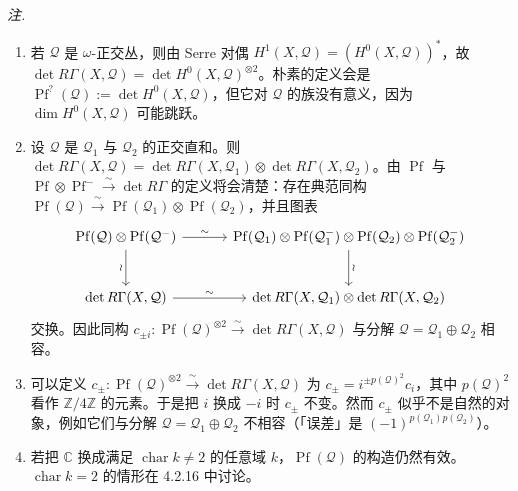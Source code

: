 \emph{注.}
\begin{enumerate}[label=(\roman*),leftmargin=2.2em]
\item 若 $\mathcal{Q}$ 是 $\omega$-正交丛，则由 Serre 对偶 $H^{1}(X,\mathcal{Q})=(H^{0}(X,\mathcal{Q}))^{*}$，故 $\det R\Gamma(X,\mathcal{Q})=\det H^{0}(X,\mathcal{Q})^{\otimes 2}$。朴素的定义会是 $\operatorname{Pf}^{?}(\mathcal{Q}):=\det H^{0}(X,\mathcal{Q})$，但它对 $\mathcal{Q}$ 的族没有意义，因为 $\dim H^{0}(X,\mathcal{Q})$ 可能跳跃。
\item 设 $\mathcal{Q}$ 是 $\mathcal{Q}_{1}$ 与 $\mathcal{Q}_{2}$ 的正交直和。则 $\det R\Gamma(X,\mathcal{Q})=\det R\Gamma(X,\mathcal{Q}_{1})\otimes\det R\Gamma(X,\mathcal{Q}_{2})$。由 $\operatorname{Pf}$ 与 $\operatorname{Pf}\otimes\operatorname{Pf}^{-}\xrightarrow{\sim}\det R\Gamma$ 的定义将会清楚：存在典范同构 $\operatorname{Pf}(\mathcal{Q})\xrightarrow{\ \sim\ }\operatorname{Pf}(\mathcal{Q}_{1})\otimes\operatorname{Pf}(\mathcal{Q}_{2})$，并且图表
\[
\begin{tikzcd}[column sep=3.2em, row sep=2.6em]
  \operatorname{Pf}(\mathcal{Q})\otimes\operatorname{Pf}(\mathcal{Q}^{-})
    \arrow[r, "\sim"]
    \arrow[d, "\wr"']
  & \operatorname{Pf}(\mathcal{Q}_{1})\otimes\operatorname{Pf}(\mathcal{Q}_{1}^{-})\otimes\operatorname{Pf}(\mathcal{Q}_{2})\otimes\operatorname{Pf}(\mathcal{Q}_{2}^{-})
    \arrow[d, "\wr"] \\
  \det R\Gamma(X,\mathcal{Q})
    \arrow[r, "\sim"]
  & \det R\Gamma(X,\mathcal{Q}_{1})\otimes\det R\Gamma(X,\mathcal{Q}_{2})
\end{tikzcd}
\]
交换。因此同构 $c_{\pm i}:\operatorname{Pf}(\mathcal{Q})^{\otimes 2}\xrightarrow{\ \sim\ }\det R\Gamma(X,\mathcal{Q})$ 与分解 $\mathcal{Q}=\mathcal{Q}_{1}\oplus\mathcal{Q}_{2}$ 相容。
\item 可以定义 $c_{\pm}:\operatorname{Pf}(\mathcal{Q})^{\otimes 2}\xrightarrow{\ \sim\ }\det R\Gamma(X,\mathcal{Q})$ 为 $c_{\pm}=i^{\pm p(\mathcal{Q})^{2}}c_{i}$，其中 $p(\mathcal{Q})^{2}$ 看作 $\mathbb{Z}/4\mathbb{Z}$ 的元素。于是把 $i$ 换成 $-i$ 时 $c_{\pm}$ 不变。然而 $c_{\pm}$ 似乎不是自然的对象，例如它们与分解 $\mathcal{Q}=\mathcal{Q}_{1}\oplus\mathcal{Q}_{2}$ 不相容（「误差」是 $(-1)^{p(\mathcal{Q}_{1})p(\mathcal{Q}_{2})}$）。
\item 若把 $\mathbb{C}$ 换成满足 $\operatorname{char}k\ne 2$ 的任意域 $k$，$\operatorname{Pf}(\mathcal{Q})$ 的构造仍然有效。$\operatorname{char}k=2$ 的情形在 4.2.16 中讨论。
\end{enumerate}

